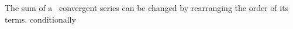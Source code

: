 {The sum of a \underlinespace\ convergent series can be changed by rearranging the order of its terms.
}
{conditionally
}